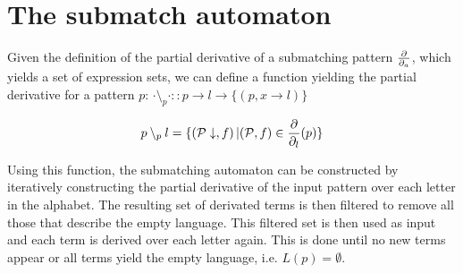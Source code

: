 \section{The submatch automaton}
\label{nfa}

Given the definition of the partial derivative of a submatching pattern $\frac{\partial}{\partial_{a}}$,
which yields a set of expression sets, we can define a function yielding the
partial derivative for a pattern $p$: $\cdot \setminus_p \cdot :: p \to l \to
\{(p, x \to l)\}$

\begin{defn}
   \[p \setminus_p l = \{ (\mathcal{P}\downarrow, f) \operatorname{|} (\mathcal{P}, f) \in \frac{\partial}{\partial_{l}}(p) \}\]
\end{defn}

Using this function, the submatching automaton can be constructed by
iteratively constructing the partial derivative of the input pattern over each
letter in the alphabet. The resulting set of derivated terms is then filtered to
remove all those that describe the empty language. This filtered set is then
used as input and each term is derived over each letter again. This is done
until no new terms appear or all terms yield the empty language, i.e. $L(p) =
\emptyset$.

